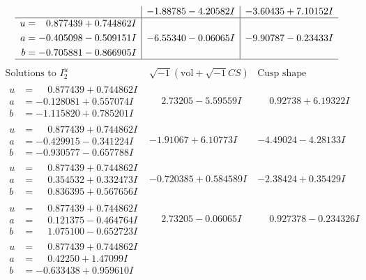 \documentclass[1p]{elsarticle_modified}
\theoremstyle{definition}
\newcommand{\I}{\sqrt{-1}}
\begin{document}
$$\begin{array}{c|c|c}
 & -1.88785 - 4.20582 I & -3.60435 + 7.10152 I \\ \hline\begin{aligned}
u &= \phantom{-}0.877439 + 0.744862 I \\
a &= -0.405098 - 0.509151 I \\
b &= -0.705881 - 0.866905 I\end{aligned}
 & -6.55340 - 0.06065 I & -9.90787 - 0.23433 I\\
 \hline 
 \end{array}$$\newpage$$\begin{array}{c|c|c}  
\text{Solutions to }I^u_{2}& \I (\text{vol} + \sqrt{-1}CS) & \text{Cusp shape}\\
 \hline 
\begin{aligned}
u &= \phantom{-}0.877439 + 0.744862 I \\
a &= -0.128081 + 0.557074 I \\
b &= -1.115820 + 0.785201 I\end{aligned}
 & \phantom{-}2.73205 - 5.59559 I & \phantom{-}0.92738 + 6.19322 I \\ \hline\begin{aligned}
u &= \phantom{-}0.877439 + 0.744862 I \\
a &= -0.429915 - 0.341224 I \\
b &= -0.930577 - 0.657788 I\end{aligned}
 & -1.91067 + 6.10773 I & -4.49024 - 4.28133 I \\ \hline\begin{aligned}
u &= \phantom{-}0.877439 + 0.744862 I \\
a &= \phantom{-}0.354532 + 0.332473 I \\
b &= \phantom{-}0.836395 + 0.567656 I\end{aligned}
 & -0.720385 + 0.584589 I & -2.38424 + 0.35429 I \\ \hline\begin{aligned}
u &= \phantom{-}0.877439 + 0.744862 I \\
a &= \phantom{-}0.121375 - 0.464764 I \\
b &= \phantom{-}1.075100 - 0.652723 I\end{aligned}
 & \phantom{-}2.73205 - 0.06065 I & \phantom{-}0.927378 - 0.234326 I \\ \hline\begin{aligned}
u &= \phantom{-}0.877439 + 0.744862 I \\
a &= \phantom{-}0.42250 + 1.47099 I \\
b &= -0.633438 + 0.959610 I\end{aligned}

\end{array}$$
\end{document}
